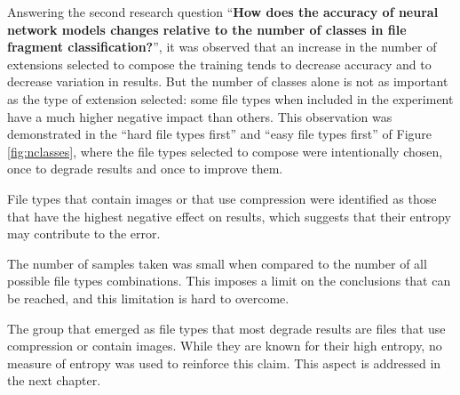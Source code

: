 Answering the second research question ``\textbf{How does the accuracy of neural network models changes relative to the number of classes in file fragment classification?}'', 
it was observed that an increase in the number of extensions selected to compose the training tends to decrease accuracy and to decrease variation in results. But the number of classes alone is not as important as the type of extension selected: some file types when included in the experiment have a much higher negative impact than others. This observation was demonstrated in the ``hard file types first'' and ``easy file types first'' of Figure \ref{fig:nclasses}, where the file types selected to compose were intentionally chosen, once to degrade results and once to improve them.


File types that contain images or that use compression were identified as those that have the highest negative effect on results, which suggests that their entropy may contribute to the error.

The number of samples taken was small when compared to the number of all possible file types combinations. This imposes a limit on the conclusions that can be reached, and this limitation is hard to overcome.

The group that emerged as file types that most degrade results are files that use compression or contain images. While they are known for their high entropy, no measure of entropy was used to reinforce this claim.
This aspect is addressed in the next chapter.
